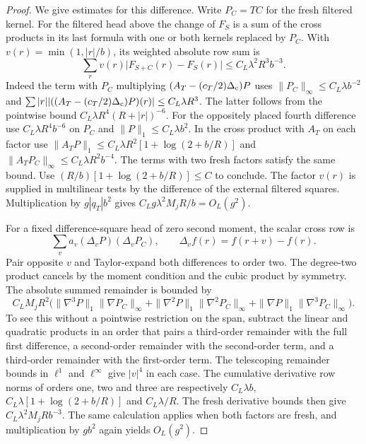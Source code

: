 \documentclass[11pt]{article}
\theoremstyle{definition}
\begin{document}
\begin{proof}
We give estimates for this difference. Write \(P_C=TC\) for
the fresh filtered kernel. For the filtered head above the
change of \(F_S\) is a sum of the cross products in its last
formula with one or both kernels replaced by \(P_C\).
With \(v(r)=\min(1,|r|/b)\), its weighted absolute row sum is
\begin{equation}
 \sum_r v(r)\bigl|F_{S+C}(r)-F_S(r)\bigr|
 \le C_L\lambda^2 R^3 b^{-3}.
\end{equation}
Indeed the term with \(P_C\) multiplying
\((A_T-(c_T/2)\Delta_{\rm c})P\) uses
\(\|P_C\|_\infty\le C_L\lambda b^{-2}\)
and \(\sum |r||((A_T-(c_T/2)\Delta_{\rm c})P)(r)|
 \le C_L\lambda R^3\). The latter follows from the
pointwise bound \(C_L\lambda R^4(R+|r|)^{-6}\).
For the oppositely placed fourth difference use
\(C_L\lambda R^4 b^{-6}\) on \(P_C\) and
\(\|P\|_1\le C_L\lambda b^2\).
In the cross product with \(A_T\) on each factor use
\(\|A_TP\|_1\le C_L\lambda R^2[1+\log(2+b/R)]\)
and \(\|A_TP_C\|_\infty\le C_L\lambda R^2 b^{-4}\).
The terms with two fresh factors satisfy the same bound.
Use \((R/b)[1+\log(2+b/R)]\le C\) to conclude.
The factor \(v(r)\) is supplied in multilinear tests
by the difference of the external filtered squares.
Multiplication by \(g|q_T|b^2\) gives
\(C_Lg\lambda^2 M_j R/b=O_L(g^2)\).

For a fixed difference-square head of zero second moment,
the scalar cross row is
\begin{equation}
 \sum_v a_v(\Delta_vP)(\Delta_vP_C),
 \qquad \Delta_v f(r)=f(r+v)-f(r).
\end{equation}
Pair opposite \(v\) and
Taylor-expand both differences to order two. The degree-two
product cancels by the moment condition and the cubic product
by symmetry. The absolute summed remainder is bounded by
\begin{equation}
 C_L M_j R^2\bigl(
  \|\nabla^3P\|_1\|\nabla P_C\|_\infty+
  \|\nabla^2P\|_1\|\nabla^2P_C\|_\infty+
  \|\nabla P\|_1\|\nabla^3P_C\|_\infty\bigr).
\end{equation}
To see this without a pointwise restriction on the span,
subtract the linear and quadratic products in an order that
pairs a third-order remainder with the full first difference,
a second-order remainder with the second-order term, and a
third-order remainder with the first-order term. The
telescoping remainder bounds in \(\ell^1\) and \(\ell^\infty\)
give \(|v|^4\) in each case. The cumulative derivative
row norms of orders one, two and three are respectively
\(C_L\lambda b\), \(C_L\lambda[1+\log(2+b/R)]\)
and \(C_L\lambda/R\). The fresh derivative bounds then
give \(C_L\lambda^2 M_j R b^{-3}\).
The same calculation applies when both factors are fresh,
and multiplication by \(g b^2\) again yields
\(O_L(g^2)\).


\end{proof}
\end{document}

